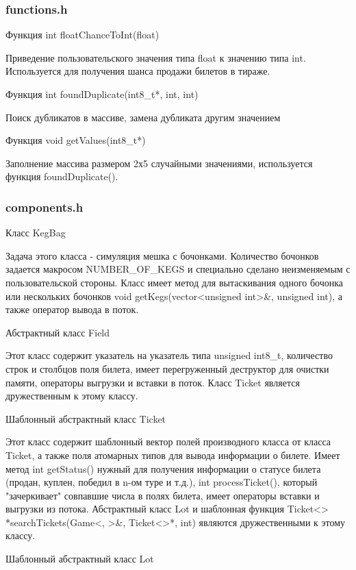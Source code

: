 \documentclass[a4paper,14pt]{article}
\begin{document}
\subsubsection{functions.h}
\begin{center}
   Функция int floatChanceToInt(float)
\end{center}

Приведение пользовательского значения типа float к значению типа int. Используется для получения шанса продажи билетов в тираже.
\newpage
\begin{center}
   Функция int foundDuplicate(int8\_t*, int, int)
\end{center}

Поиск дубликатов в массиве, замена дубликата другим значением
\begin{center}
   Функция void getValues(int8\_t*)
\end{center}

Заполнение массива размером 2х5 случайными значениями, используется функция foundDuplicate().
\subsubsection{components.h}
\begin{center}
   Класс KegBag
\end{center}

Задача этого класса - симуляция мешка с бочонками. Количество бочонков задается макросом NUMBER\_OF\_KEGS и специально сделано неизменяемым с пользовательской стороны. Класс имеет метод для вытаскивания одного бочонка или нескольких бочонков void getKegs(vector<unsigned int>&, unsigned int), а также оператор вывода в поток.
\begin{center}
   Абстрактный класс Field
\end{center}

Этот класс содержит указатель на указатель типа unsigned int8\_t, количество строк и столбцов поля билета, имеет перегруженный деструктор для очистки памяти, операторы выгрузки и вставки в поток. Класс Ticket является дружественным к этому классу.
\begin{center}
   Шаблонный абстрактный класс Ticket
\end{center}

Этот класс содержит шаблонный вектор полей производного класса от класса Ticket, а также поля атомарных типов для вывода информации о билете. Имеет метод int getStatus() нужный для получения информации о статусе билета (продан, куплен, победил в n-ом туре и т.д.), int processTicket(), который "зачеркивает" совпавшие числа в полях билета, имеет операторы вставки и выгрузки из потока. Абстрактный класс Lot и шаблонная функция Ticket<> *searchTickets(Game<, >&, Ticket<>*, int) являются дружественными к этому классу.
\begin{center}
   Шаблонный абстрактный класс Lot
\end{center}
\end{document}
